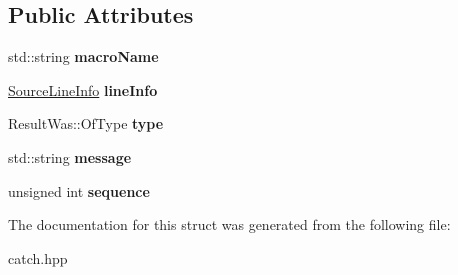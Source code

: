 \subsection*{Public Attributes}
\begin{DoxyCompactItemize}
\item 
\mbox{\label{structCatch_1_1MessageInfo_a156ade4b3cc731f6ec7b542ae47ba8e3}} 
std\+::string {\bfseries macro\+Name}
\item 
\mbox{\label{structCatch_1_1MessageInfo_a985165328723e599696ebd8e43195cc5}} 
\hyperlink{structCatch_1_1SourceLineInfo}{Source\+Line\+Info} {\bfseries line\+Info}
\item 
\mbox{\label{structCatch_1_1MessageInfo_ae928b9117465c696e45951d9d0284e78}} 
Result\+Was\+::\+Of\+Type {\bfseries type}
\item 
\mbox{\label{structCatch_1_1MessageInfo_ab6cd06e050bf426c6577502a5c50e256}} 
std\+::string {\bfseries message}
\item 
\mbox{\label{structCatch_1_1MessageInfo_a7f4f57ea21e50160adefce7b68a781d6}} 
unsigned int {\bfseries sequence}
\end{DoxyCompactItemize}


The documentation for this struct was generated from the following file\+:\begin{DoxyCompactItemize}
\item 
catch.\+hpp\end{DoxyCompactItemize}
